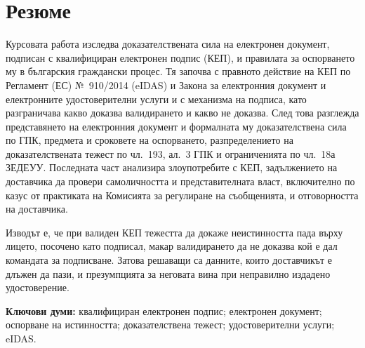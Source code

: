 \section*{Резюме}
\label{sec:rezyume}

Курсовата работа изследва доказателствената сила на електронен документ, подписан с
квалифициран електронен подпис (КЕП), и правилата за оспорването му в българския
граждански процес. Тя започва с правното действие на КЕП по Регламент (ЕС) №~910/2014
(eIDAS) и Закона за електронния документ и електронните удостоверителни услуги и с
механизма на подписа, като разграничава какво доказва валидирането и какво не доказва.
След това разглежда представянето на електронния документ и формалната му доказателствена
сила по ГПК, предмета и сроковете на оспорването, разпределението на доказателствената
тежест по чл.~193, ал.~3 ГПК и ограниченията по чл.~18а ЗЕДЕУУ. Последната част анализира
злоупотребите с КЕП, задължението на доставчика да провери самоличността и
представителната власт, включително по казус от практиката на Комисията за регулиране на
съобщенията, и отговорността на доставчика.

Изводът е, че при валиден КЕП тежестта да докаже неистинността пада върху лицето,
посочено като подписал, макар валидирането да не доказва кой е дал командата за
подписване. Затова решаващи са данните, които доставчикът е длъжен да пази, и презумпцията
за неговата вина при неправилно издадено удостоверение.

\medskip
\noindent\textbf{Ключови думи:} квалифициран електронен подпис; електронен документ;
оспорване на истинността; доказателствена тежест; удостоверителни услуги; eIDAS.
